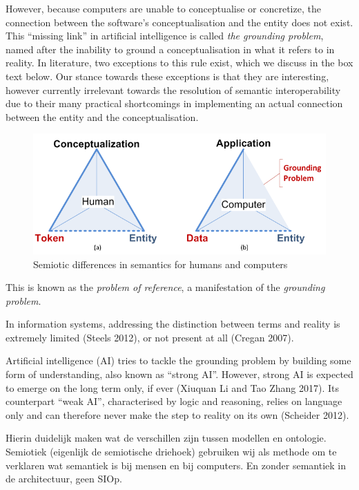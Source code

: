 \documentclass[a4paper,11pt,oneside,oldfontcommands]{memoir}
\theoremstyle{definition}
\theoremstyle{break}		%
\numberwithin{equation}{chapter}
\numberwithin{figure}{chapter}
\begin{document}
However, because computers are unable to conceptualise or concretize,
the connection between the software's conceptualisation and the entity
does not exist. This ``missing link'' in artificial intelligence is
called \emph{the grounding problem}, named after the inability to ground
a conceptualisation in what it refers to in reality. In literature, two
exceptions to this rule exist, which we discuss in the box text below.
Our stance towards these exceptions is that they are interesting,
however currently irrelevant towards the resolution of semantic
interoperability due to their many practical shortcomings in
implementing an actual connection between the entity and the
conceptualisation.

\begin{figure}
\hypertarget{fig:semiotic-diffs}{%
\centering
\includegraphics{./tex2pdf.9980/1ce00968991a55f6ab1ac66202d4d01993d7c060.png}
\caption{Semiotic differences in semantics for humans and
computers}\label{fig:semiotic-diffs}
}
\end{figure}

This is known as the \emph{problem of reference}, a manifestation of the
\emph{grounding problem}.

In information systems, addressing the distinction between terms and
reality is extremely limited (Steels 2012), or not present at all
(Cregan 2007).

Artificial intelligence (AI) tries to tackle the grounding problem by
building some form of understanding, also known as ``strong AI''.
However, strong AI is expected to emerge on the long term only, if ever
(Xiuquan Li and Tao Zhang 2017). Its counterpart ``weak AI'',
characterised by logic and reasoning, relies on language only and can
therefore never make the step to reality on its own (Scheider 2012).

Hierin duidelijk maken wat de verschillen zijn tussen modellen en
ontologie. Semiotiek (eigenlijk de semiotische driehoek) gebruiken wij
als methode om te verklaren wat semantiek is bij mensen en bij
computers. En zonder semantiek in de architectuur, geen SIOp.
\end{document}
